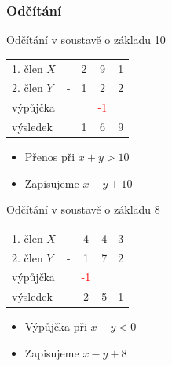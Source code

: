 	\begin{frame}
    \frametitle{Odčítání}

		\begin{minipage}[t][\textheight][t]{0.49\textwidth}
      Odčítání v soustavě o základu 10
      \vspace{10mm}
      
			\boldmath
			\begin{tabular}{ p{20mm} c c c c}
				1. člen $X$  &   & 2 & 9 & 1 \\
				2. člen $Y$  & - & 1 & 2 & 2 \\
        výpůjčka     &   &  & \textcolor{red}{-1} &   \\
        \hline
        výsledek     &   & 1 & 6 & 9 \\
			\end{tabular}
      
      \vspace{10mm}
      \begin{itemize}
        \item Přenos při $x + y > 10$
        \item Zapisujeme $x - y + 10$
      \end{itemize}
      
		\end{minipage}
		\begin{minipage}[t][\textheight][t]{0.5\textwidth}
      Odčítání v soustavě o základu 8
      \vspace{10mm}
      
			\boldmath
			\begin{tabular}{ p{20mm} c c c c}
				1. člen $X$  &   & 4 & 4 & 3 \\
				2. člen $Y$  & - & 1 & 7 & 2 \\
        výpůjčka     &   & \textcolor{red}{-1} &   &   \\
        \hline
        výsledek     &   & 2 & 5 & 1 \\
			\end{tabular}
      
      \vspace{10mm}
      \begin{itemize}
        \item Výpůjčka při $x - y < 0$
        \item Zapisujeme $x - y + 8$
      \end{itemize}
      
		\end{minipage}
		
	\end{frame}
  
